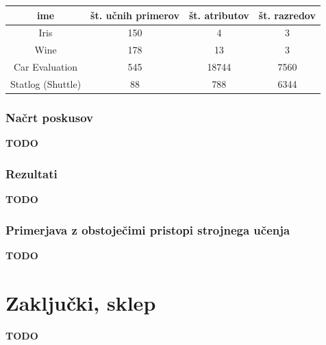 \documentclass[a4paper,12pt,openright]{book}
\begin{document}
    \begin{center}
        \begin{tabular}{||c c c c||}
            \hline
            ime & št. učnih primerov & št. atributov & št. razredov \\ [0.5ex]
            \hline
            Iris & 150 & 4 & 3 \\
            \hline
            Wine & 178 & 13 & 3 \\
            \hline
            Car Evaluation & 545 & 18744 & 7560 \\
            \hline
            Statlog (Shuttle) & 88 & 788 & 6344 \\ [1ex]
            \hline
        \end{tabular}
    \end{center}

    \subsection{Načrt poskusov}\label{subsec:nacrt-poskusov}
    \textbf{TODO}
    \subsection{Rezultati}\label{subsec:rezultati}
    \textbf{TODO}
    \subsection{Primerjava z obstoječimi pristopi strojnega učenja}\label{subsec:primerjava-z-obstojecimi-pristopi-strojnega-ucenja}
    \textbf{TODO}


    \chapter{Zaključki, sklep}\label{ch:zakljucki-sklep}
    \textbf{TODO}






    \printbibliography[heading=bibintoc,title={Celotna literatura}]
\end{document}
